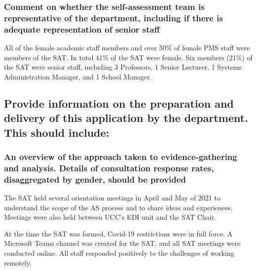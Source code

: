 \subsubsection{Comment on whether the self-assessment team is representative of the department, including if there is adequate representation of senior staff}

All of the female academic staff members and over 50\% of female PMS staff were members of the SAT. 
In total 41\% of the SAT were female.
Six members (21\%) of the SAT were senior staff, including 3 Professors, 1 Senior Lecturer, 1 Systems Administration Manager, and 1 School Manager. 


\subsection{Provide information on the preparation and delivery of this application by the department. This should include:}


\subsubsection{An overview of the approach taken to evidence-gathering and analysis. Details of consultation response rates, disaggregated by gender, should be provided}

The SAT held several orientation meetings in April and May of 2021 to understand the scope of the AS process and to share ideas and experiences. Meetings were also held between UCC's EDI unit and the SAT Chair. 


At the time the SAT was formed, Covid-19 restrictions were in full force. A Microsoft Teams channel was created for the SAT, and all SAT meetings were conducted online.
All staff responded positively to the challenges of working remotely.


